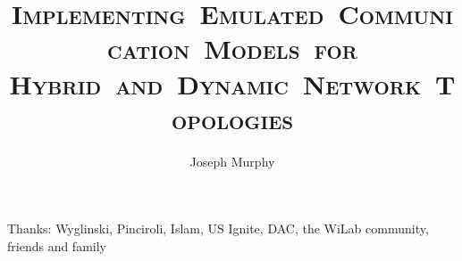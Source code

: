 \documentclass[11pt]{mvlthesis}
\title{\scshape \mbox{Implementing Emulated Communication Models for}\\
\scshape \mbox{Hybrid and Dynamic Network Topologies}}
\author{Joseph Murphy}
\begin{document}
\maketitle
\begin{abstract}



\end{abstract}

\begin{frontmatter}
\begin{acknowledgements}
\begin{center}
\vspace{0.4in}
Thanks: Wyglinski, Pinciroli, Islam, US Ignite, DAC, the WiLab community, friends and family
\end{center}
\end{acknowledgements}

\tableofcontents
\listoffigures
\listoftables

\end{frontmatter}











\appendix
\end{document}
